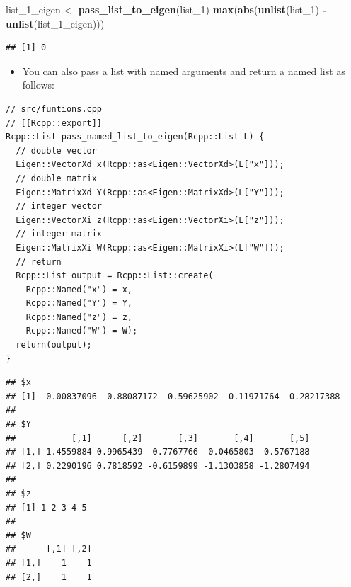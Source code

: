 \documentclass[]{book}
\newenvironment{Shaded}{\begin{snugshade}}{\end{snugshade}}
\newcommand{\KeywordTok}[1]{\textcolor[rgb]{0.13,0.29,0.53}{\textbf{#1}}}
\newcommand{\DecValTok}[1]{\textcolor[rgb]{0.00,0.00,0.81}{#1}}
\newcommand{\StringTok}[1]{\textcolor[rgb]{0.31,0.60,0.02}{#1}}
\newcommand{\CommentTok}[1]{\textcolor[rgb]{0.56,0.35,0.01}{\textit{#1}}}
\newcommand{\OperatorTok}[1]{\textcolor[rgb]{0.81,0.36,0.00}{\textbf{#1}}}
\newcommand{\NormalTok}[1]{#1}
\providecommand{\tightlist}{%
  \setlength{\itemsep}{0pt}\setlength{\parskip}{0pt}}
\begin{document}
\begin{Shaded}
\begin{Highlighting}[]
\NormalTok{list_1_eigen <-}\StringTok{ }\KeywordTok{pass_list_to_eigen}\NormalTok{(list_}\DecValTok{1}\NormalTok{)}
\KeywordTok{max}\NormalTok{(}\KeywordTok{abs}\NormalTok{(}\KeywordTok{unlist}\NormalTok{(list_}\DecValTok{1}\NormalTok{) }\OperatorTok{-}\StringTok{ }\KeywordTok{unlist}\NormalTok{(list_1_eigen)))}
\end{Highlighting}
\end{Shaded}

\begin{verbatim}
## [1] 0
\end{verbatim}

\begin{itemize}
\tightlist
\item
  You can also pass a list with named arguments and return a named list
  as follows:
\end{itemize}

\begin{verbatim}
// src/funtions.cpp
// [[Rcpp::export]]
Rcpp::List pass_named_list_to_eigen(Rcpp::List L) {
  // double vector
  Eigen::VectorXd x(Rcpp::as<Eigen::VectorXd>(L["x"]));
  // double matrix
  Eigen::MatrixXd Y(Rcpp::as<Eigen::MatrixXd>(L["Y"]));
  // integer vector
  Eigen::VectorXi z(Rcpp::as<Eigen::VectorXi>(L["z"]));
  // integer matrix
  Eigen::MatrixXi W(Rcpp::as<Eigen::MatrixXi>(L["W"]));
  // return
  Rcpp::List output = Rcpp::List::create(
    Rcpp::Named("x") = x, 
    Rcpp::Named("Y") = Y, 
    Rcpp::Named("z") = z, 
    Rcpp::Named("W") = W);
  return(output);
}
\end{verbatim}

\begin{Shaded}
\end{Shaded}

\begin{verbatim}
## $x
## [1]  0.00837096 -0.88087172  0.59625902  0.11971764 -0.28217388
## 
## $Y
##           [,1]      [,2]       [,3]       [,4]       [,5]
## [1,] 1.4559884 0.9965439 -0.7767766  0.0465803  0.5767188
## [2,] 0.2290196 0.7818592 -0.6159899 -1.1303858 -1.2807494
## 
## $z
## [1] 1 2 3 4 5
## 
## $W
##      [,1] [,2]
## [1,]    1    1
## [2,]    1    1
\end{verbatim}
\end{document}
